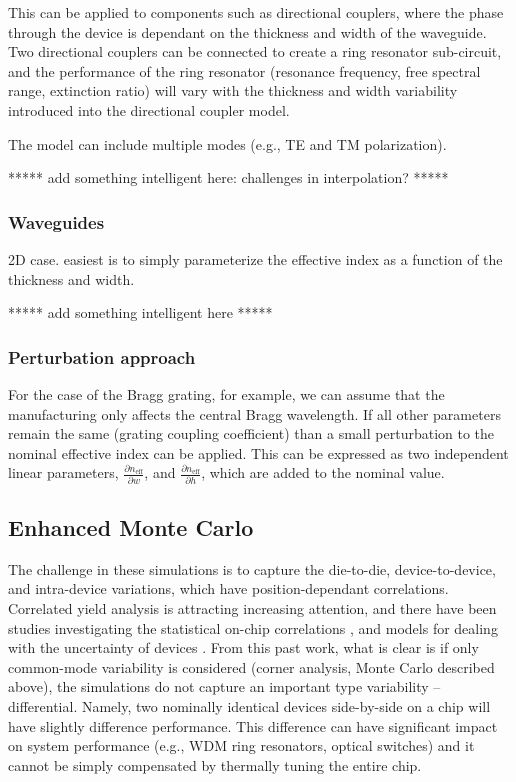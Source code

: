 \documentclass[journal]{spie}
\begin{document}
This can be applied to components such as directional couplers, where the phase through the device is dependant on the thickness and width of the waveguide.  Two directional couplers can be connected to create a ring resonator sub-circuit, and the performance of the ring resonator (resonance frequency, free spectral range, extinction ratio) will vary with the thickness and width variability introduced into the directional coupler model.

The model can include multiple modes (e.g., TE and TM polarization).

*****  add something intelligent here: challenges in interpolation? *****  

\subsubsection{Waveguides}
2D case. easiest is to simply parameterize the effective index as a function of the thickness and width.

*****  add something intelligent here *****

\subsubsection{Perturbation approach}
For the case of the Bragg grating, for example, we can assume that the manufacturing only affects the central Bragg wavelength.  If all other parameters remain the same (grating coupling coefficient) than a small perturbation to the nominal effective index can be applied.  This can be expressed as two independent linear parameters, $ \frac{\partial n_\text{eff}}{\partial w}$, and $ \frac{\partial n_\text{eff}}{\partial h}$, which are added to the nominal value.


\subsection{Enhanced Monte Carlo}

The challenge in these simulations is to capture the die-to-die, device-to-device, and intra-device variations, which have position-dependant correlations.  Correlated yield analysis is attracting increasing attention, and there have been studies investigating the statistical on-chip correlations \cite{lukas14:OFC,hochberg:wafer}, and models for dealing with the uncertainty of devices \cite{MIT:uncertainty}.  From this past work, what is clear is if only common-mode variability is considered (corner analysis, Monte Carlo described above), the simulations do not capture an important type variability -- differential.  Namely, two nominally identical devices side-by-side on a chip will have slightly difference performance.  This difference can have significant impact on system performance (e.g., WDM ring resonators, optical switches) and it cannot be simply compensated by thermally tuning the entire chip.
\end{document}
